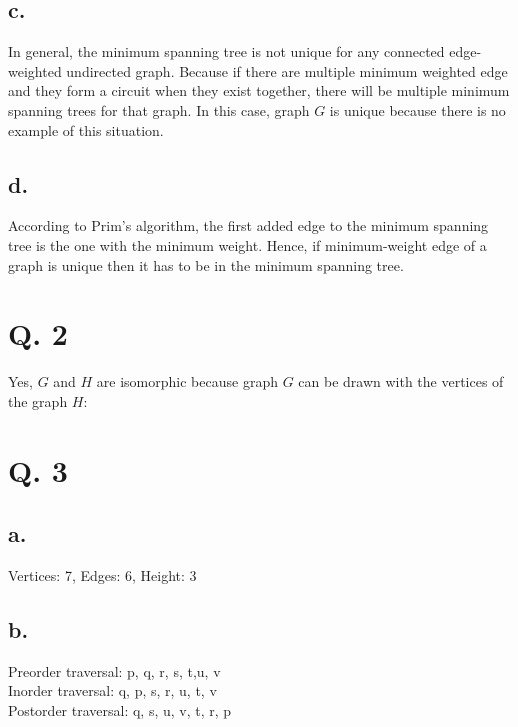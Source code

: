 \documentclass[12pt]{article}
\begin{document}
\subsection*{c.}
In general, the minimum spanning tree is not unique for any connected edge-weighted undirected graph. Because if there are multiple minimum weighted edge and they form a circuit when they exist together, there will be multiple minimum spanning trees for that graph. In this case, graph $G$ is unique because there is no example of this situation.
\subsection*{d.}
According to Prim’s algorithm, the first added edge to the minimum spanning tree is the one with the minimum weight. Hence, if minimum-weight edge of a graph is unique then it has to be in the minimum spanning tree.
\section*{Q. 2}
Yes, $G$ and $H$ are isomorphic because graph $G$ can be drawn with the vertices of the graph $H$:
\begin{center}
\end{center}

\section*{Q. 3}
\subsection*{a.}
Vertices: 7, Edges: 6, Height: 3
\subsection*{b.}
Preorder traversal: p, q, r, s, t,u, v \\
Inorder traversal: q, p, s, r, u, t, v \\
Postorder traversal: q, s, u, v, t, r, p 
\end{document}
